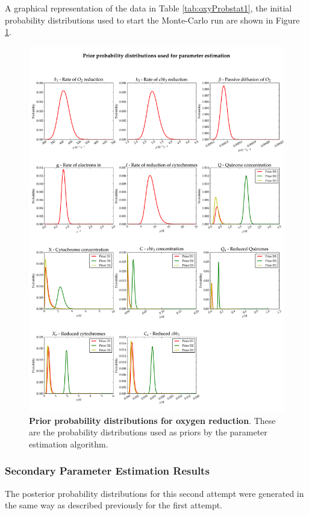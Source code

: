 A graphical representation of the data in Table \ref{tab:oxyProbstat1}, the initial probability distributions used to start the Monte-Carlo run are shown in Figure \ref{fig:oxypriors1}.
\begin{figure}[p]
 \centering
 \includegraphics[width=15cm, trim=0cm 0cm 0cm 0cm]{./05-oxygenreduction/data/priors2.pdf}
 \caption[Prior probability distributions for oxygen reduction]{{\bf Prior probability distributions for oxygen reduction}. These are the probability distributions used as priors by the parameter estimation algorithm.
 \label{fig:oxypriors1}}
\end{figure}
\subsubsection{Secondary Parameter Estimation Results}
The posterior probability distributions for this second attempt were generated in the same way as described previously for the first attempt.

